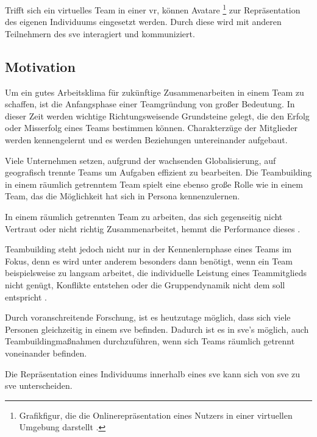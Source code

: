 \documentclass[a4paper,11pt]{article}%
\renewcommand{\\}{\vspace*{0.5\baselineskip} \newline}
\begin{document}
Trifft sich ein virtuelles Team in einer \ac{vr}, können Avatare \footnote{Grafikfigur, die die Onlinerepräsentation eines Nutzers in einer virtuellen Umgebung darstellt \citep[p.1]{neustaedter2009presenting}.} zur Repräsentation des eigenen Individuums eingesetzt werden. Durch diese wird mit anderen Teilnehmern des \ac{sve} interagiert und kommuniziert.

\newpage
	\subsection{Motivation}
	Um ein gutes Arbeitsklima für zukünftige Zusammenarbeiten in einem Team zu schaffen, ist die Anfangsphase einer Teamgründung von großer Bedeutung. In dieser Zeit werden wichtige Richtungsweisende Grundsteine gelegt, die den Erfolg oder Misserfolg eines Teams bestimmen können. Charakterzüge der Mitglieder werden kennengelernt und es werden Beziehungen untereinander aufgebaut.
	
	Viele Unternehmen setzen, aufgrund der wachsenden Globalisierung, auf geografisch trennte Teams um Aufgaben effizient zu bearbeiten. Die Teambuilding in einem räumlich getrenntem Team spielt eine ebenso große Rolle wie in einem Team, das die Möglichkeit hat sich in Persona kennenzulernen.
	
	In einem räumlich getrennten Team zu arbeiten, das sich gegenseitig nicht Vertraut oder nicht richtig Zusammenarbeitet, hemmt die Performance dieses \citep[p. 98-107]{huang1998supporting} \citep[p. 399-417]{turoff1993distributed}.
	
	Teambuilding steht jedoch nicht nur in der Kennenlernphase eines Teams im Fokus, denn es wird unter anderem besonders dann benötigt, wenn ein Team beispielsweise zu langsam arbeitet, die individuelle Leistung eines Teammitglieds nicht genügt, Konflikte entstehen oder die Gruppendynamik nicht dem soll entspricht \citep[p. 1-3]{biech2007pfeiffer}.
	
	Durch voranschreitende Forschung, ist es heutzutage möglich, dass sich viele Personen gleichzeitig in einem \ac{sve} befinden. Dadurch ist es in \ac{sve}'s möglich, auch Teambuildingmaßnahmen durchzuführen, wenn sich Teams räumlich getrennt voneinander befinden.
	
	Die Repräsentation eines Individuums innerhalb eines \ac{sve} kann sich von \ac{sve} zu \ac{sve} unterscheiden.
	
\end{document}
